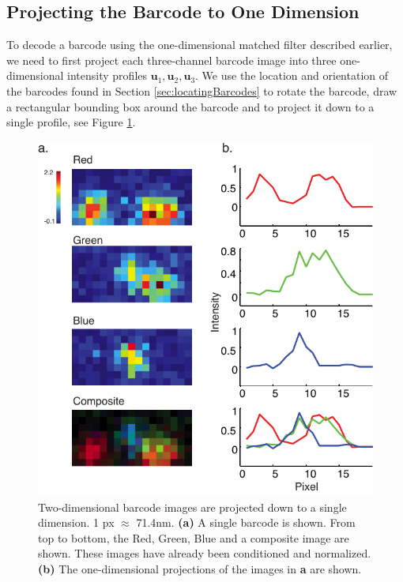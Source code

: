    
\subsection{Projecting the Barcode to One Dimension} \label{sec:projectDown}
	To decode a barcode using the one-dimensional matched filter described earlier, we need to first project each three-channel barcode image into three one-dimensional intensity profiles $\mathbf{u}_1, \mathbf{u}_2, \mathbf{u}_3$.  We use the location and orientation of the barcodes found in Section \ref{sec:locatingBarcodes} to rotate the barcode, draw a rectangular bounding box around the barcode and to project it down to a single profile, see Figure \ref{fig:projectDown}.


	\begin{figure}[htbp]
	\begin{center}
		\includegraphics[width=\textwidth]{figures/theoryProjectBarcode}
		\caption{Two-dimensional barcode images are projected down to a single dimension. 1 px $\approx$ 71.4nm. \textbf{(a)}  A single barcode is shown. From top to bottom, the Red, Green,  Blue and a composite image are shown. These images have already been conditioned and normalized. \textbf{(b)} The one-dimensional projections of the images in \textbf{a} are shown. \label{fig:projectDown}}
	\end{center}	
	\end{figure}



